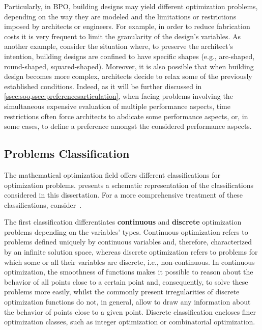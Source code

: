 	Particularly, in \ac{BPO}, building designs may yield different optimization problems, depending on the way they are modeled and the limitations or restrictions imposed by architects or engineers. For example, in order to reduce fabrication costs it is very frequent to limit the granularity of the design's variables. As another example, consider the situation where, to preserve the architect's intention, building designs are confined to have specific shapes (e.g., arc-shaped, round-shaped, squared-shaped). Moreover, it is also possible that when building design becomes more complex, architects decide to relax some of the previously established conditions. Indeed, as it will be further discussed in \cref{ssec:soo,ssec:preferencesarticulation}, when facing problems involving the simultaneous expensive evaluation of multiple performance aspects, time restrictions often force architects to abdicate some performance aspects, or, in some cases, to define a preference amongst the considered performance aspects.
	
\subsection{Problems Classification}
	
	The mathematical optimization field offers different classifications for optimization problems.  presents a schematic representation of the classifications considered in this dissertation. For a more comprehensive treatment of these classifications, consider~\cite{Koziel2011, Nocedal2011NumericalOptimization}. 
	 
	The first classification differentiates \textbf{continuous} and \textbf{discrete} optimization problems depending on the variables' types. Continuous optimization refers to problems defined uniquely by continuous variables and, therefore, characterized by an infinite solution space, whereas discrete optimization refers to problems for which some or all their variables are discrete, i.e., non-continuous. In continuous optimization, the smoothness of functions makes it possible to reason about the behavior of all points close to a certain point and, consequently, to solve these problems more easily, whilst the commonly present irregularities of discrete optimization functions do not, in general, allow to draw any information about the behavior of points close to a given point. Discrete classification encloses finer optimization classes, such as integer optimization or combinatorial optimization. 
	
